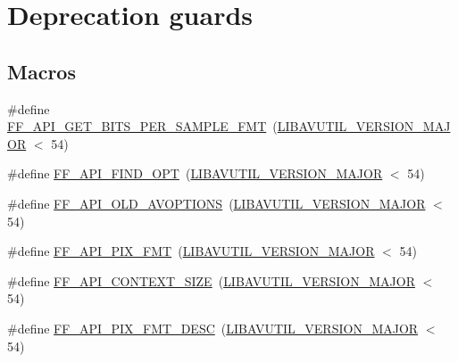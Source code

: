 \hypertarget{group__depr__guards}{}\section{Deprecation guards}
\label{group__depr__guards}
\subsection*{Macros}
\begin{DoxyCompactItemize}
\item 
\#define \hyperlink{group__depr__guards_gaba919e28a72e4d68601f5fc4abdd9e1a}{F\+F\+\_\+\+A\+P\+I\+\_\+\+G\+E\+T\+\_\+\+B\+I\+T\+S\+\_\+\+P\+E\+R\+\_\+\+S\+A\+M\+P\+L\+E\+\_\+\+F\+MT}~(\hyperlink{group__lavu__ver_gaa29a3ad3376b8050d9ef4779045f745e}{L\+I\+B\+A\+V\+U\+T\+I\+L\+\_\+\+V\+E\+R\+S\+I\+O\+N\+\_\+\+M\+A\+J\+OR} $<$ 54)
\item 
\#define \hyperlink{group__depr__guards_gac5c5fa36a02863e504a2fb6035e396b7}{F\+F\+\_\+\+A\+P\+I\+\_\+\+F\+I\+N\+D\+\_\+\+O\+PT}~(\hyperlink{group__lavu__ver_gaa29a3ad3376b8050d9ef4779045f745e}{L\+I\+B\+A\+V\+U\+T\+I\+L\+\_\+\+V\+E\+R\+S\+I\+O\+N\+\_\+\+M\+A\+J\+OR} $<$ 54)
\item 
\#define \hyperlink{group__depr__guards_gaba8a5fc4bdfbc953295a2fde56c7c5cb}{F\+F\+\_\+\+A\+P\+I\+\_\+\+O\+L\+D\+\_\+\+A\+V\+O\+P\+T\+I\+O\+NS}~(\hyperlink{group__lavu__ver_gaa29a3ad3376b8050d9ef4779045f745e}{L\+I\+B\+A\+V\+U\+T\+I\+L\+\_\+\+V\+E\+R\+S\+I\+O\+N\+\_\+\+M\+A\+J\+OR} $<$ 54)
\item 
\#define \hyperlink{group__depr__guards_ga1c0f94e3a9bcb00383e24fb588952756}{F\+F\+\_\+\+A\+P\+I\+\_\+\+P\+I\+X\+\_\+\+F\+MT}~(\hyperlink{group__lavu__ver_gaa29a3ad3376b8050d9ef4779045f745e}{L\+I\+B\+A\+V\+U\+T\+I\+L\+\_\+\+V\+E\+R\+S\+I\+O\+N\+\_\+\+M\+A\+J\+OR} $<$ 54)
\item 
\#define \hyperlink{group__depr__guards_ga5a0762b905a431b3f87cc2edce7125d3}{F\+F\+\_\+\+A\+P\+I\+\_\+\+C\+O\+N\+T\+E\+X\+T\+\_\+\+S\+I\+ZE}~(\hyperlink{group__lavu__ver_gaa29a3ad3376b8050d9ef4779045f745e}{L\+I\+B\+A\+V\+U\+T\+I\+L\+\_\+\+V\+E\+R\+S\+I\+O\+N\+\_\+\+M\+A\+J\+OR} $<$ 54)
\item 
\#define \hyperlink{group__depr__guards_ga827d870e3fd7689100d91d927b616365}{F\+F\+\_\+\+A\+P\+I\+\_\+\+P\+I\+X\+\_\+\+F\+M\+T\+\_\+\+D\+E\+SC}~(\hyperlink{group__lavu__ver_gaa29a3ad3376b8050d9ef4779045f745e}{L\+I\+B\+A\+V\+U\+T\+I\+L\+\_\+\+V\+E\+R\+S\+I\+O\+N\+\_\+\+M\+A\+J\+OR} $<$ 54)
\item 

\end{DoxyCompactItemize}
